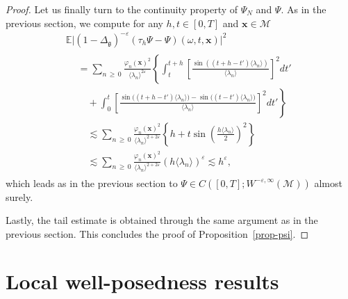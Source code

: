 \documentclass[AHL,Unicode,longabstracts,published]{cedram}
\renewcommand{\th}{\tau_h}
\newcommand{\E}{\mathbb{E}}
\newcommand{\x}{\mathbf{x}}
\newcommand{\M}{\mathcal{M}}
\newcommand{\g}{\mathfrak{g}}
\newcommand{\Dlg}{\Delta_{\g}}
\newcommand{\eps}{\varepsilon}
\renewcommand{\o}{\omega}
\newcommand{\les}{\lesssim}
\newcommand{\jb}[1] {\langle #1 \rangle}
\begin{document}
\begin{proof}
Let us finally turn to the continuity property of $\Psi_N$ and $\Psi$. As in the previous section, we compute for any $h,t\in [0,T]$ and $\x\in\M$
\begin{multline*}
\E\big|(1-\Dlg)^{-\eps}(\th \Psi-\Psi)(\o,t,\x)\big|^2 \\
\begin{aligned}
&= \sum_{n\,\geq\,0}\frac{\varphi_n(\x)^2}{\jb{\lambda_n}^{2\eps}}\left\{\int_t^{t+h}\left[\frac{\sin\left((t+h-t')\jb{\lambda_n}\right)}{\jb{\lambda_n}}\right]^2dt'\right. \\
&\quad+\left. \int_0^{t}\left[\frac{\sin\big((t+h-t')\jb{\lambda_n}\big)-\sin\big((t-t')\jb{\lambda_n}\big)}{\jb{\lambda_n}}\right]^2dt'\right\}\\
&\quad\les \sum_{n\,\geq\,0}\frac{\varphi_n(\x)^2}{\jb{\lambda_n}^{2+2\eps}}
\left\{h+t\sin\left(\frac{h\jb{\lambda_n}}{2}\right)^2\right\}\\
&\quad\les \sum_{n\,\geq\,0}\frac{\varphi_n(\x)^2}{\jb{\lambda_n}^{2+2\eps}}(h\jb{\lambda_n})^{\eps} \les h^{\eps},
\end{aligned}
\end{multline*}
which leads as in the previous section to $\Psi\in C([0,T];W^{-\eps,\infty}(\M))$ almost surely.

Lastly, the tail estimate is obtained through the same argument as in the previous section. This concludes the proof of Proposition~\ref{prop-psi}.
\end{proof}



\section{Local well-posedness results}\label{sec-local}
\end{document}
